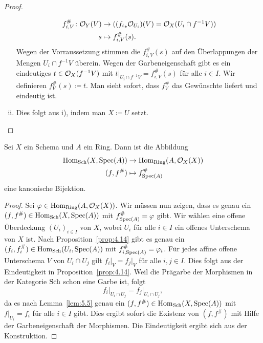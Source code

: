 \begin{lem}
\begin{proof}
\begin{enumerate}[i)]
\begin{align*}
				f_{i,V}^{\#}\colon \mathcal{O}_Y(V)&\to (({f_i}_*\mathcal{O}_{U_i})(V) = \mathcal{O}_X(U_i \cap f^{-1}V))\\
				s &\mapsto f^{\#}_{i,V}(s).
			\end{align*}
			Wegen der Vorraussetzung stimmen die $f_{i,V}^{\#}(s)$ auf den Überlappungen der Mengen $U_i\cap f^{-1}V$ überein. Wegen der Garbeneigenschaft gibt es ein eindeutiges $t \in \mathcal{O}_X(f^{-1}V)$ mit $t\vert_{U_i\cap f^{-1}V} = f_{i,V}^{\#}(s)$ für alle $i \in I$. Wir definieren $f^{\#}_V(s) \coloneqq t$. Man sieht sofort, dass $f_V^{\#}$ das Gewünschte liefert und eindeutig ist.
			\item Dies folgt aus i), indem man $X \coloneqq U$ setzt.
		\end{enumerate}
	\end{proof}
\end{lem}

\begin{prop}
\label{prop:5.6}
	Sei $X$ ein Schema und $A$ ein Ring. Dann ist die Abbildung
	\begin{align*}
		\operatorname{Hom}_{\operatorname{Sch}}(X,\operatorname{Spec}(A)) &\to \operatorname{Hom}_{\operatorname{Ring}}(A,\mathcal{O}_X(X))\\
		(f,f^{\#}) & \mapsto f^{\#}_{\operatorname{Spec}(A)}
	\end{align*}
	eine kanonische Bijektion.
	\begin{proof}
		Sei $\varphi\in \operatorname{Hom}_{\operatorname{Ring}}(A,\mathcal{O}_X(X))$. Wir müssen nun zeigen, dass es genau ein $(f,f^{\#}) \in \operatorname{Hom}_{\operatorname{Sch}}(X,\operatorname{Spec}(A))$ mit $f^{\#}_{\operatorname{Spec}(A)} = \varphi$ gibt. Wir wählen eine offene Überdeckung $(U_i)_{i\in I}$ von $X$, wobei $U_i$ für alle $i \in I$ ein offenes Unterschema von $X$ ist. Nach Proposition~\ref{prop:4.14} gibt es genau ein $(f_i,f_i^{\#}) \in \operatorname{Hom}_{\operatorname{Sch}}(U_i,\operatorname{Spec}(A))$ mit $f^{\#}_{i,\operatorname{Spec}(A)} = \varphi_i$. Für jedes affine offene Unterschema $V$ von $U_i \cap U_j$ gilt $f_i\vert_V = f_j\vert_V$ für alle $i,j \in I$. Dies folgt aus der Eindeutigkeit in Proposition~\ref{prop:4.14}. Weil die Prägarbe der Morphismen in der Kategorie $\operatorname{Sch}$ schon eine Garbe ist, folgt
		\[
			f_i\vert_{U_i\cap U_j} = f_j\vert_{U_i\cap U_j},
		\]
		da es nach Lemma~\ref{lem:5.5} genau ein $(f,f^{\#}) \in \operatorname{Hom}_{\operatorname{Sch}}(X,\operatorname{Spec}(A))$ mit $f\vert_{U_i} = f_i$ für alle $i \in I$ gibt. Dies ergibt sofort die Existenz von $(f,f^{\#})$ mit Hilfe der Garbeneigenschaft der Morphismen. Die Eindeutigkeit ergibt sich aus der Konstruktion.
	\end{proof}
\end{prop}

